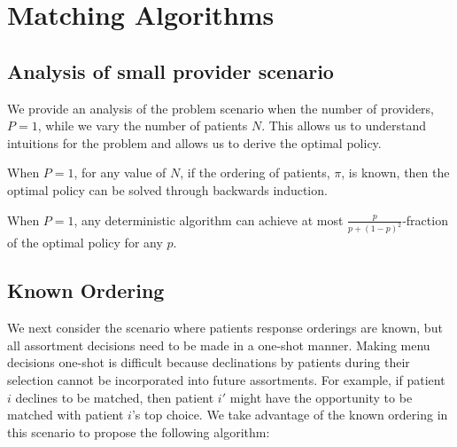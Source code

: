 \section{Matching Algorithms}
\subsection{Analysis of small provider scenario}
We provide an analysis of the problem scenario when the number of providers, $P=1$, while we vary the number of patients $N$. 
This allows us to understand intuitions for the problem and allows us to derive the optimal policy. 

\begin{lemma}
    When $P=1$, for any value of $N$, if the ordering of patients, $\pi$, is known, then the optimal policy can be solved through backwards induction. 
\end{lemma}

\begin{lemma}
    When $P=1$, any deterministic algorithm can achieve at most $\frac{p}{p+({1-p})^2}$-fraction of the optimal policy for any $p$. 
\end{lemma}
\subsection{Known Ordering}
We next consider the scenario where patients response orderings are known, but all assortment decisions need to be made in a one-shot manner.
Making menu decisions one-shot is difficult because declinations by patients during their selection cannot be incorporated into future assortments. 
For example, if patient $i$ declines to be matched, then patient $i'$ might have the opportunity to be matched with patient $i$'s top choice. 
We take advantage of the known ordering in this scenario to propose the following algorithm: 

